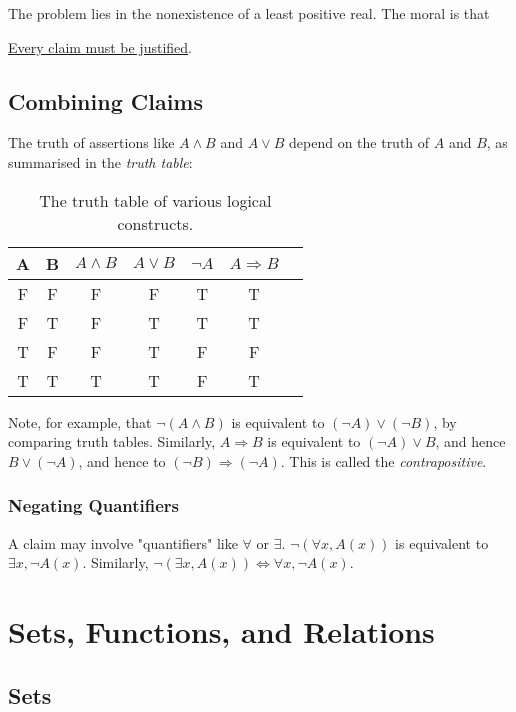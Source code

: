 \documentclass[12pt]{article}
\begin{document}
The problem lies in the nonexistence of a least positive real.
The moral is that
\begin{center}
    \underline{Every claim must be justified}.
\end{center}

\subsection{Combining Claims}

The truth of assertions like $A \land B$ and $A \lor B$ depend on
the truth of $A$ and $B$, as summarised in the \emph{truth table}:

\begin{table}[h]
    \centering
    \begin{tabular}{ |c|c|c|c|c|c|c| }
        \hline
        A & B & $A \land B$ & $A \lor B$ & $\neg A$ & $A \Rightarrow B$ \\
        \hline
        F & F & F & F & T & T\\
        F & T & F & T & T & T\\
        T & F & F & T & F & F\\
        T & T & T & T & F & T\\
        \hline
    \end{tabular}
    \caption{The truth table of various logical constructs.}
\end{table}

Note, for example, that $\neg (A \land B)$ is equivalent to
$(\neg A) \lor (\neg B)$, by comparing truth tables.
Similarly, $A \Rightarrow B$ is equivalent to $(\neg A) \lor B$,
and hence $B \lor (\neg A)$,
and hence to $(\neg B) \Rightarrow (\neg A)$.
This is called the \emph{contrapositive}.

\subsubsection*{Negating Quantifiers}

A claim may involve "quantifiers" like $\forall$ or $\exists$.
$\neg(\forall x, A(x))$ is equivalent to $\exists x, \neg A(x)$.
Similarly, $\neg(\exists x, A(x)) \iff \forall x, \neg A(x)$.

\section{Sets, Functions, and Relations}

\subsection{Sets}
\end{document}
